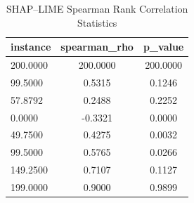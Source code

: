 \begin{table}
\centering
\caption{SHAP–LIME Spearman Rank Correlation Statistics}
\label{tab:agreement}
\begin{tabular}{lcc}
\toprule
instance & spearman_rho & p_value \\
\midrule
200.0000 & 200.0000 & 200.0000 \\
99.5000 & 0.5315 & 0.1246 \\
57.8792 & 0.2488 & 0.2252 \\
0.0000 & -0.3321 & 0.0000 \\
49.7500 & 0.4275 & 0.0032 \\
99.5000 & 0.5765 & 0.0266 \\
149.2500 & 0.7107 & 0.1127 \\
199.0000 & 0.9000 & 0.9899 \\
\bottomrule
\end{tabular}
\end{table}
